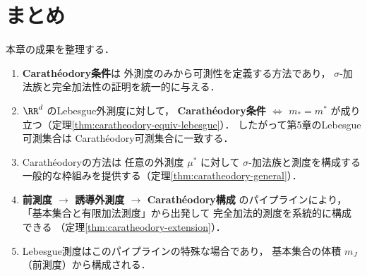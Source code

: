 \section{まとめ}\label{sec:caratheodory-summary}

本章の成果を整理する．

\begin{enumerate}
\item \textbf{Carath\'eodory条件}は
外測度のみから可測性を定義する方法であり，
$\sigma$-加法族と完全加法性の証明を統一的に与える．

\item $\RR^d$ のLebesgue外測度に対して，
\textbf{Carath\'eodory条件 $\iff$ $m_* = m^*$}
が成り立つ（定理\ref{thm:caratheodory-equiv-lebesgue}）．
したがって第5章のLebesgue可測集合は
Carath\'eodory可測集合に一致する．

\item Carath\'eodoryの方法は
任意の外測度 $\mu^*$ に対して $\sigma$-加法族と測度を構成する
一般的な枠組みを提供する（定理\ref{thm:caratheodory-general}）．

\item \textbf{前測度 $\to$ 誘導外測度 $\to$ Carath\'eodory構成}
のパイプラインにより，
「基本集合と有限加法測度」から出発して
完全加法的測度を系統的に構成できる
（定理\ref{thm:caratheodory-extension}）．

\item Lebesgue測度はこのパイプラインの特殊な場合であり，
基本集合の体積 $m_J$（前測度）から構成される．
\end{enumerate}
